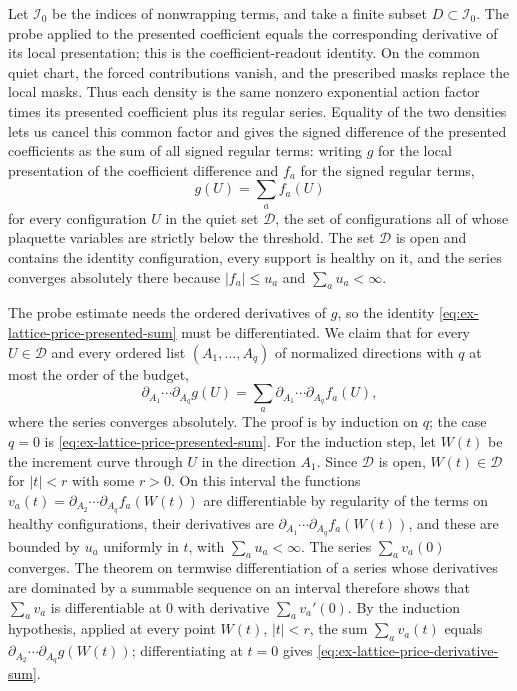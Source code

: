 Let \(\mathcal I_0\) be the indices of nonwrapping terms, and take a finite
subset \(D\subset\mathcal I_0\). The probe applied to the presented
coefficient equals the corresponding derivative of its local presentation;
this is the coefficient-readout identity.
On the common quiet chart, the forced contributions vanish, and the
prescribed masks replace the local masks. Thus each density is the same
nonzero exponential action factor times its presented coefficient plus its
regular series. Equality of the two densities lets us cancel this common
factor and gives the signed difference of the presented coefficients as
the sum of all signed regular terms: writing \(g\) for the local
presentation of the coefficient difference and \(f_a\) for the signed
regular terms,
\begin{equation}
 g(U)=\sum_a f_a(U)
 \label{eq:ex-lattice-price-presented-sum}
\end{equation}
for every configuration \(U\) in the quiet set \(\mathcal D\), the set of
configurations all of whose plaquette variables are strictly below the
threshold. The set \(\mathcal D\) is open and contains the identity
configuration, every support is healthy on it, and the series converges
absolutely there because \(|f_a|\leq u_a\) and \(\sum_au_a<\infty\).

The probe estimate needs the ordered derivatives of \(g\), so the identity
\eqref{eq:ex-lattice-price-presented-sum} must be differentiated. We claim
that for every \(U\in\mathcal D\) and every ordered list
\((A_1,\ldots,A_q)\) of normalized directions with \(q\) at most the order
of the budget,
\begin{equation}
 \partial_{A_1}\cdots\partial_{A_q}g(U)
   =\sum_a\partial_{A_1}\cdots\partial_{A_q}f_a(U),
 \label{eq:ex-lattice-price-derivative-sum}
\end{equation}
where the series converges absolutely. The proof is by induction on \(q\);
the case \(q=0\) is \eqref{eq:ex-lattice-price-presented-sum}. For the
induction step, let \(W(t)\) be the increment curve through \(U\) in the
direction \(A_1\). Since \(\mathcal D\) is open, \(W(t)\in\mathcal D\) for
\(|t|<r\) with some \(r>0\). On this interval the functions
\(v_a(t)=\partial_{A_2}\cdots\partial_{A_q}f_a(W(t))\) are differentiable
by regularity of the terms on healthy configurations, their derivatives are
\(\partial_{A_1}\cdots\partial_{A_q}f_a(W(t))\), and these are bounded by
\(u_a\) uniformly in \(t\), with \(\sum_au_a<\infty\). The series
\(\sum_av_a(0)\) converges. The theorem on termwise differentiation of a
series whose derivatives are dominated by a summable sequence on an
interval therefore shows that \(\sum_av_a\) is differentiable at \(0\) with
derivative \(\sum_av_a'(0)\). By the induction hypothesis, applied at
every point \(W(t)\), \(|t|<r\), the sum \(\sum_av_a(t)\) equals
\(\partial_{A_2}\cdots\partial_{A_q}g(W(t))\); differentiating at \(t=0\)
gives \eqref{eq:ex-lattice-price-derivative-sum}.

